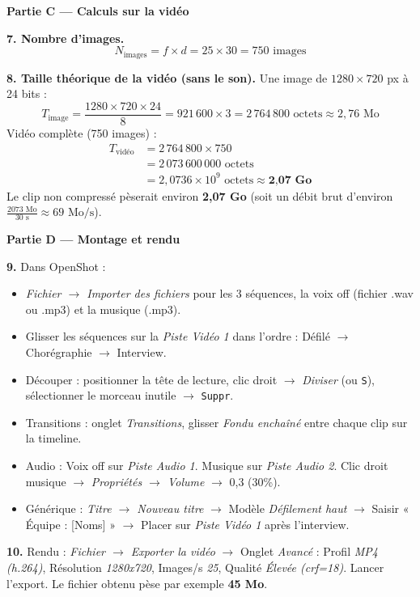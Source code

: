 \documentclass[11pt]{article}
\begin{document}
\begin{exoresolu}
\textbf{Partie C — Calculs sur la vidéo}

\textbf{7. Nombre d'images.}
\[ N_{\text{images}} = f \times d = 25 \times 30 = 750 \text{ images} \]

\textbf{8. Taille théorique de la vidéo (sans le son).} Une image de $1280 \times 720$ px à 24 bits :
\[ T_{\text{image}} = \frac{1280 \times 720 \times 24}{8} = 921\,600 \times 3 = 2\,764\,800 \text{ octets} \approx 2,76 \text{ Mo} \]
Vidéo complète (750 images) :
\begin{align*}
T_{\text{vidéo}} &= 2\,764\,800 \times 750 \\
                 &= 2\,073\,600\,000 \text{ octets} \\
                 &= 2,0736 \times 10^{9} \text{ octets} \approx \textbf{2,07 Go}
\end{align*}
Le clip non compressé pèserait environ \textbf{2,07 Go} (soit un débit brut d'environ $\frac{2073 \text{ Mo}}{30 \text{ s}} \approx 69 \text{ Mo/s}$).

\textbf{Partie D — Montage et rendu}

\textbf{9.} Dans OpenShot :
\begin{itemize}
  \item \emph{Fichier $\rightarrow$ Importer des fichiers} pour les 3 séquences, la voix off (fichier .wav ou .mp3) et la musique (.mp3).
  \item Glisser les séquences sur la \emph{Piste Vidéo 1} dans l'ordre : Défilé $\rightarrow$ Chorégraphie $\rightarrow$ Interview.
  \item Découper : positionner la tête de lecture, clic droit $\rightarrow$ \emph{Diviser} (ou \texttt{S}), sélectionner le morceau inutile $\rightarrow$ \texttt{Suppr}.
  \item Transitions : onglet \emph{Transitions}, glisser \emph{Fondu enchaîné} entre chaque clip sur la timeline.
  \item Audio : Voix off sur \emph{Piste Audio 1}. Musique sur \emph{Piste Audio 2}. Clic droit musique $\rightarrow$ \emph{Propriétés $\rightarrow$ Volume} $\rightarrow$ 0,3 (30\%).
  \item Générique : \emph{Titre $\rightarrow$ Nouveau titre} $\rightarrow$ Modèle \emph{Défilement haut} $\rightarrow$ Saisir « Équipe : [Noms] » $\rightarrow$ Placer sur \emph{Piste Vidéo 1} après l'interview.
\end{itemize}

\textbf{10.} Rendu : \emph{Fichier $\rightarrow$ Exporter la vidéo} $\rightarrow$ Onglet \emph{Avancé} : Profil \emph{MP4 (h.264)}, Résolution \emph{1280x720}, Images/s \emph{25}, Qualité \emph{Élevée (crf=18)}. Lancer l'export. Le fichier obtenu pèse par exemple \textbf{45 Mo}.


\end{exoresolu}
\end{document}
